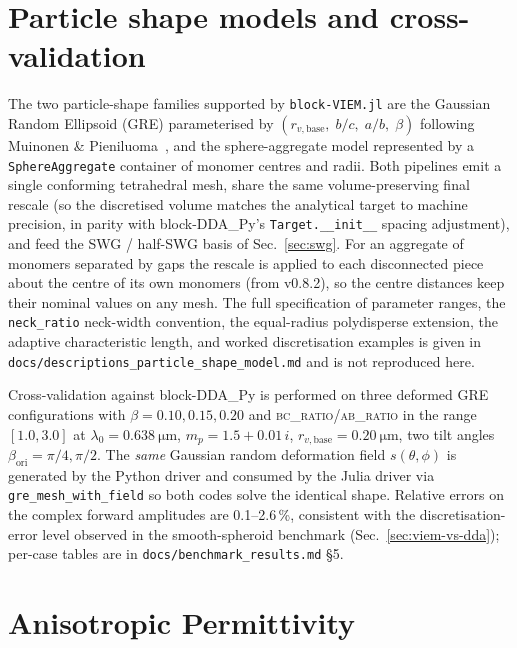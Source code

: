 \documentclass[11pt,a4paper]{article}
\begin{document}
\section{Particle shape models and cross-validation}
\label{sec:gre}

The two particle-shape families supported by \texttt{block-VIEM.jl}
are the Gaussian Random Ellipsoid (GRE) parameterised by
$(r_{v,\text{base}},\; b\!/\!c,\; a\!/\!b,\; \beta)$ following
Muinonen \& Pieniluoma~\cite{MuinonenPieniluoma2011}, and the
sphere-aggregate model represented by a \texttt{SphereAggregate}
container of monomer centres and radii.  Both pipelines emit a
single conforming tetrahedral mesh, share the same volume-preserving
final rescale (so the discretised volume matches the analytical
target to machine precision, in parity with block-DDA\_Py's
\texttt{Target.\_\_init\_\_} spacing adjustment), and feed the SWG /
half-SWG basis of Sec.~\ref{sec:swg}.  For an aggregate of monomers
separated by gaps the rescale is applied to each disconnected piece
about the centre of its own monomers (from v0.8.2), so the centre
distances keep their nominal values on any mesh.  The full specification of
parameter ranges, the \texttt{neck\_ratio} neck-width convention,
the equal-radius polydisperse extension, the adaptive characteristic
length, and worked discretisation examples is given in
\texttt{docs/descriptions\_particle\_shape\_model.md} and is not
reproduced here.

Cross-validation against block-DDA\_Py is performed on three
deformed GRE configurations with $\beta = 0.10, 0.15, 0.20$ and
\textsc{bc\_ratio}/\textsc{ab\_ratio} in the range
$[1.0, 3.0]$ at $\lambda_0 = \SI{0.638}{\micro\meter}$, $m_p = 1.5
+ 0.01\,i$, $r_{v,\text{base}} = \SI{0.20}{\micro\meter}$, two
tilt angles $\beta_{\text{ori}} = \pi/4, \pi/2$.  The
\emph{same} Gaussian random deformation field $s(\theta,\phi)$ is
generated by the Python driver and consumed by the Julia driver via
\texttt{gre\_mesh\_with\_field} so both codes solve the identical
shape.  Relative errors on the complex forward amplitudes are
0.1--2.6\,\%, consistent with the discretisation-error level
observed in the smooth-spheroid benchmark
(Sec.~\ref{sec:viem-vs-dda}); per-case tables are in
\texttt{docs/benchmark\_results.md} \S 5.

\section{Anisotropic Permittivity}
\label{sec:anisotropic}
\end{document}
